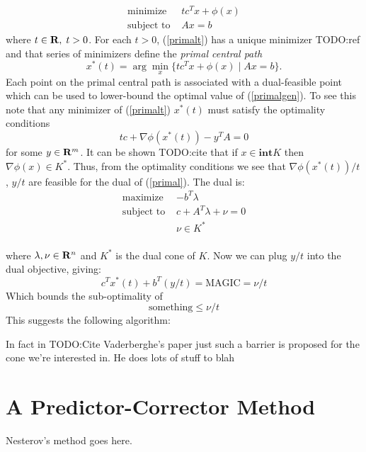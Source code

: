 \documentclass{article}
\begin{document}
\begin{equation}\label{primalt}
  \begin{array}{ll}
    \mbox{minimize}    & tc^Tx + \phi(x)\\
    \mbox{subject to } & Ax = b
  \end{array}
\end{equation}
where $t \in \mathbf{R},\;t >0$. For each $t >0$, (\ref{primalt}) has a unique minimizer TODO:ref
and that series of minimizers define the \emph{primal central path}
\[
  x^*(t) = \arg\min_x\{tc^Tx + \phi(x) \mid Ax=b\}.
\]
Each point on the primal central path is associated with a dual-feasible point which
can be used to lower-bound the optimal value of (\ref{primalgen}). To see this note that
any minimizer of (\ref{primalt}) $x^*(t)$ must satisfy the optimality conditions
\[
  tc + \nabla\phi(x^*(t)) - y^TA = 0
\]
for some $y\in\mathbf{R}^m$. It can be shown TODO:cite that if  $x \in \mathbf{int} K$ then
$\nabla\phi(x) \in K^*$. Thus, from the optimality conditions we 
see that $\nabla\phi(x^*(t))/t$, $y/t$ are feasible for the dual of (\ref{primal}). 
The dual is:
\begin{equation}\label{dual}
  \begin{array}{ll}
    \mbox{maximize}    & -b^T\lambda \\
    \mbox{subject to } & c + A^T\lambda + \nu = 0 \\
                       & \nu \in K^* \\
  \end{array}
\end{equation}

where $\lambda, \nu \in \mathbf{R}^n$ and $K^*$ is the dual cone of $K$. Now we can plug 
$y/t$ into the dual objective, giving:
\[
  c^Tx^*(t) + b^T(y/t) =   \text{MAGIC} = \nu/t
\]
Which bounds the sub-optimality of 
\[
  \text{something} \leq \nu/t 
\]
This suggests the following algorithm:


In fact in TODO:Cite Vaderberghe's paper just such a barrier is proposed for the cone we're
interested in. He does lots of stuff to blah 

\section{A Predictor-Corrector Method}
Nesterov's method goes here.
\end{document}
